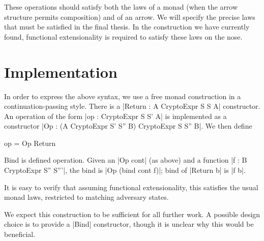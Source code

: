 These operations should satisfy both the laws of a monad (when the arrow structure permits composition) and of an arrow.
We will specify the precise laws that must be satisfied in the final thesis.  In the construction we have currently
found, functional extensionality is required to satisfy these laws on the nose.

\section{Implementation}

In order to express the above syntax, we use a free monad construction in a continuation-passing style.  There is a
|Return : A \to CryptoExpr S S A| constructor.  An operation of the form |op : \Gamma \to CryptoExpr S S' A| is
implemented as a constructor |Op : \Gamma \to (A \to CryptoExpr S' S'' B) \to CryptoExpr S S'' B|.  We then define
\begin{code}
    op \gamma = Op \gamma Return
\end{code}

Bind is defined operation.  Given an |Op \gamma cont| (as above) and a function |f : B \to CryptoExpr S'' S'''|, the
bind is |Op \gamma (bind cont f)|; bind of |Return b| is |f b|.

It is easy to verify that assuming functional extensionality, this satisfies the usual monad laws, restricted to
matching adversary states.

We expect this construction to be sufficient for all further work.  A possible design choice is to provide a |Bind|
constructor, though it is unclear why this would be beneficial.


